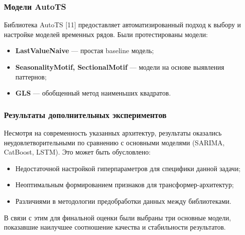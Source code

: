 \subsubsection{Модели AutoTS}

\hspace*{1.25cm}Библиотека AutoTS [11] предоставляет автоматизированный подход к выбору и настройке моделей временных рядов. Были протестированы модели:
\begin{itemize}
	\item \textbf{LastValueNaive} --- простая baseline модель;
	\item \textbf{SeasonalityMotif, SectionalMotif} --- модели на основе выявления паттернов;
	\item \textbf{GLS} --- обобщенный метод наименьших квадратов.
\end{itemize}

\subsubsection{Результаты дополнительных экспериментов}

\hspace*{1.25cm}Несмотря на современность указанных архитектур, результаты оказались неудовлетворительными по сравнению с основными моделями (SARIMA, CatBoost, LSTM). Это может быть обусловлено:
\begin{itemize}
	\item Недостаточной настройкой гиперпараметров для специфики данной задачи;
	\item Неоптимальным формированием признаков для трансформер-архитектур;
	\item Различиями в методологии предобработки данных между библиотеками.
\end{itemize}

\hspace*{1.25cm}В связи с этим для финальной оценки были выбраны три основные модели, показавшие наилучшее соотношение качества и стабильности результатов.